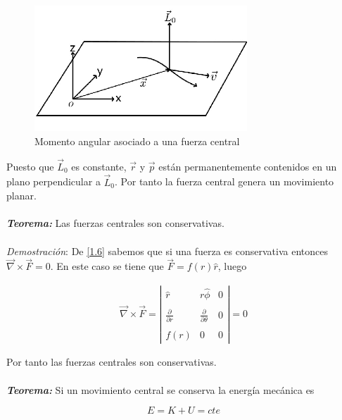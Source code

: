 \documentclass[12pt]{report}
\begin{document}
\begin{figure}[H]
	\begin{center}
	\includegraphics[width=8cm]{figura11.png} 
	\caption{ Momento angular asociado a una fuerza central}
	\label{fig.1}
	\end{center}
\end{figure}

Puesto que $\vec{L}_0$ es constante, $\vec{r}$ y $\vec{p}$ están  permanentemente contenidos en un plano perpendicular a $\vec{L}_0$. Por tanto la fuerza central genera un movimiento planar. \\
\\


\textbf{\textit{Teorema:}} Las fuerzas centrales son conservativas. \\
\\

 \textit{Demostración}: De \eqref{1.6} sabemos que si una fuerza es conservativa entonces $\displaystyle \vec{\nabla} \times \vec{F} =0$. En este caso se tiene que $\vec{F}=f(r)\hat{r}$, luego
 
\begin{eqnarray}
\vec{\nabla} \times \vec{F}=
\left|
\begin{array}{ccc}
 \hat{r} & r\hat{\phi} & 0 \\ \\
\displaystyle\frac{\partial}{\partial r} & \displaystyle\frac{\partial }{\partial \theta} & 0 \\ \\
 f(r) & 0 & 0
\end{array}
\right|
=0
\end{eqnarray}
 
 Por tanto las fuerzas centrales son conservativas. \\
 \\
 
 \textbf{\textit{Teorema:}} Si un movimiento central se conserva la energía mecánica es 
 
\begin{equation}
E=K+U=cte
\end{equation}
\end{document}
